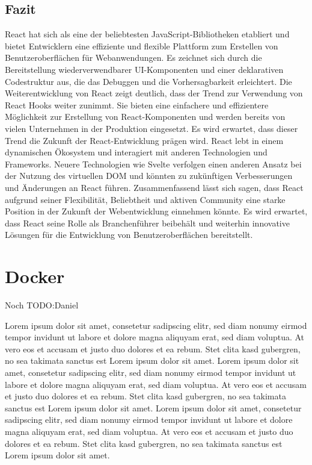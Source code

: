 \subsection{Fazit}
React hat sich als eine der beliebtesten JavaScript-Bibliotheken etabliert und bietet Entwicklern eine effiziente und flexible Plattform zum Erstellen von Benutzeroberflächen für Webanwendungen. Es zeichnet sich durch die Bereitstellung wiederverwendbarer UI-Komponenten und einer deklarativen Codestruktur aus, die das Debuggen und die Vorhersagbarkeit erleichtert. 
Die Weiterentwicklung von React zeigt deutlich, dass der Trend zur Verwendung von React Hooks weiter zunimmt. Sie bieten eine einfachere und effizientere Möglichkeit zur Erstellung von React-Komponenten  und werden bereits von vielen Unternehmen in der Produktion eingesetzt. Es wird erwartet, dass dieser Trend die Zukunft der React-Entwicklung  prägen wird.  React lebt in einem dynamischen Ökosystem und interagiert mit anderen Technologien und Frameworks. Neuere Technologien wie Svelte verfolgen einen anderen Ansatz bei der Nutzung des virtuellen DOM und könnten zu zukünftigen Verbesserungen und Änderungen an React führen. 
Zusammenfassend lässt sich sagen, dass React aufgrund seiner Flexibilität, Beliebtheit und aktiven Community  eine starke Position in der Zukunft der Webentwicklung einnehmen könnte. Es wird erwartet, dass React seine Rolle als Branchenführer beibehält und weiterhin innovative Lösungen für die Entwicklung von Benutzeroberflächen bereitstellt.
\newpage
\section{Docker}
Noch TODO:Daniel\\
\begin{figure}
\centering
{}
\end{figure}

Lorem ipsum dolor sit amet, consetetur sadipscing elitr, sed diam nonumy eirmod tempor invidunt ut labore et dolore magna aliquyam erat, sed diam voluptua. At vero eos et accusam et justo duo dolores et ea rebum. Stet clita kasd gubergren, no sea takimata sanctus est Lorem ipsum dolor sit amet. Lorem ipsum dolor sit amet, consetetur sadipscing elitr, sed diam nonumy eirmod tempor invidunt ut labore et dolore magna aliquyam erat, sed diam voluptua. At vero eos et accusam et justo duo dolores et ea rebum. Stet clita kasd gubergren, no sea takimata sanctus est Lorem ipsum dolor sit amet. Lorem ipsum dolor sit amet, consetetur sadipscing elitr, sed diam nonumy eirmod tempor invidunt ut labore et dolore magna aliquyam erat, sed diam voluptua. At vero eos et accusam et justo duo dolores et ea rebum. Stet clita kasd gubergren, no sea takimata sanctus est Lorem ipsum dolor sit amet.

